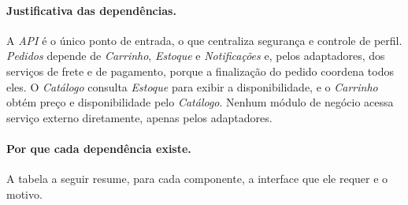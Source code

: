 \documentclass[12pt,a4paper]{article}
\begin{document}
\paragraph{Justificativa das dependências.} A \emph{API} é o único ponto
de entrada, o que centraliza segurança e controle de perfil. \emph{Pedidos}
depende de \emph{Carrinho}, \emph{Estoque} e \emph{Notificações} e, pelos
adaptadores, dos serviços de frete e de pagamento, porque a finalização do
pedido coordena todos eles. O
\emph{Catálogo} consulta \emph{Estoque} para exibir a disponibilidade, e o
\emph{Carrinho} obtém preço e disponibilidade pelo \emph{Catálogo}.
Nenhum módulo de negócio acessa serviço externo diretamente, apenas
pelos adaptadores.

\paragraph{Por que cada dependência existe.} A tabela a seguir resume, para cada componente, a interface que ele requer e o motivo.
\end{document}
